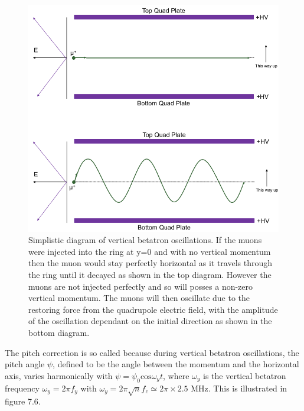 \begin{figure}[!h]
\centering 
\includegraphics[scale=0.5]{Figures/vertoscillationdiagram.png}
\decoRule
\caption{Simplistic diagram of vertical betatron oscillations. If the muons were injected into the ring at y=0 and with no vertical momentum then the muon would stay perfectly horizontal as it travels through the ring until it decayed as shown in the top diagram. However the muons are not injected perfectly and so will posses a non-zero vertical momentum. The muons will then oscillate due to the restoring force from the quadrupole electric field, with the amplitude of the oscillation dependant on the initial direction as shown in the bottom diagram.}
\label{fig:vertoscillationdiagram.png}
\end{figure}

The pitch correction is so called because during vertical betatron oscillations, the pitch angle $\psi$, defined to be the angle between the momentum and the horizontal axis, varies harmonically with $\psi = \psi_{0}\mathrm{cos}\omega_{y}t$, where $\omega_{y}$ is the vertical betatron frequency $\omega_{y} = 2\pi{f_{y}}$ with $\omega_{y} = 2\pi\sqrt{n}f_{c} \simeq2\pi\times2.5$ MHz. This is illustrated in figure 7.6.


